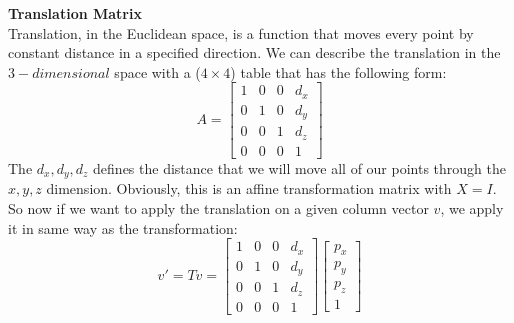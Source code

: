 \textbf{Translation Matrix}\\
Translation, in the Euclidean space, is a function that moves every point by constant distance in a specified direction. We can describe the translation in the \(3-dimensional\) space with a (\(4\times4\)) table that has the following form:
\[
A = 
\begin{bmatrix}
1 & 0 & 0 & d_x\\
0 & 1 & 0 & d_y\\
0 & 0 & 1 & d_z\\
0 & 0 & 0 & 1
\end{bmatrix}
\]
The \(d_x,d_y,d_z\) defines the distance that we will move all of our points through the \(x,y,z\) dimension. Obviously, this is an affine transformation matrix with \(X = I\). So now if we want to apply the translation on a given column vector \(v\), we apply it in same way as the transformation:
\[
v' = Tv =
\begin{bmatrix}
1 & 0 & 0 & d_x\\
0 & 1 & 0 & d_y\\
0 & 0 & 1 & d_z\\
0 & 0 & 0 & 1
\end{bmatrix}
\begin{bmatrix}
p_x\\
p_y\\
p_z\\
1
\end{bmatrix}
\]

